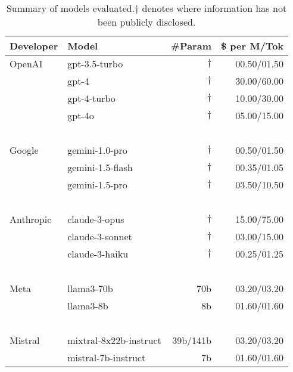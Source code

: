 \begin{table}[ht]
    \centering
    \begin{tabular}{l|lrr}
        \textbf{Developer} & \textbf{Model} & \textbf{\#Param} & \textbf{\$ per M/Tok} \\
        \hline
        OpenAI  & gpt-3.5-turbo     & ${\dagger}$ & 00.50/01.50 \\
        ~       & gpt-4             & ${\dagger}$ & 30.00/60.00 \\
        ~       & gpt-4-turbo       & ${\dagger}$ & 10.00/30.00 \\
        ~       & gpt-4o           & ${\dagger}$ & 05.00/15.00 \\
        ~       & ~                 & ~             & ~     \\
        Google  & gemini-1.0-pro    & ${\dagger}$ & 00.50/01.50 \\
        ~       & gemini-1.5-flash  & ${\dagger}$ & 00.35/01.05 \\
        ~       & gemini-1.5-pro    & ${\dagger}$ & 03.50/10.50 \\
        ~       & ~                 & ~             & ~     \\
        Anthropic & claude-3-opus & ${\dagger}$ & 15.00/75.00 \\
        ~       & claude-3-sonnet & ${\dagger}$ & 03.00/15.00 \\
        ~       & claude-3-haiku & ${\dagger}$ & 00.25/01.25 \\
        ~       & ~                         & ~             & ~      \\
        Meta    & llama3-70b        & 70b       & 03.20/03.20 \\
        ~       & llama3-8b         & 8b        & 01.60/01.60 \\
        ~       & ~                         & ~             & ~      \\
        Mistral & mixtral-8x22b-instruct & 39b/141b  & 03.20/03.20 \\
        ~       & mistral-7b-instruct & 7b     & 01.60/01.60 \\
    \end{tabular}
    \caption{Summary of models evaluated.${\dagger}$ denotes where information has not been publicly disclosed.}
    \label{tab:models}
\end{table}